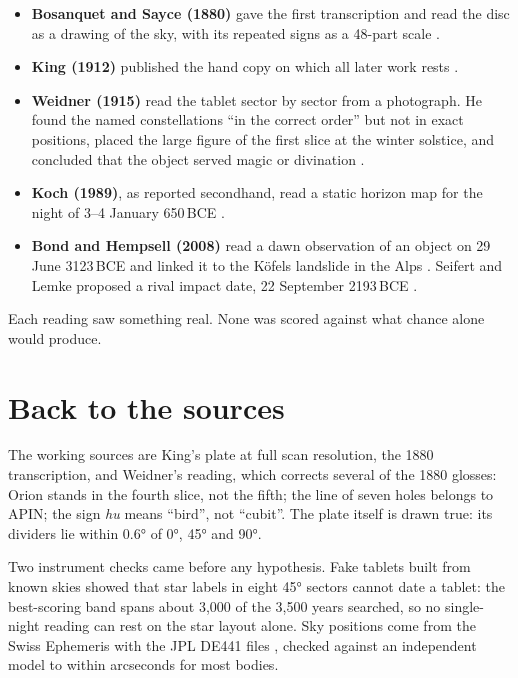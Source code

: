\documentclass[11pt]{article}
\begin{document}
\begin{itemize}
\item \textbf{Bosanquet and Sayce (1880)} gave the first transcription and read the disc as a drawing
of the sky, with its repeated signs as a 48-part scale \cite{bs1880}.
\item \textbf{King (1912)} published the hand copy on which all later work rests \cite{king1912}.
\item \textbf{Weidner (1915)} read the tablet sector by sector from a photograph. He found the named
constellations ``in the correct order'' but not in exact positions, placed the large figure of
the first slice at the winter solstice, and concluded that the object served magic or divination
\cite{weidner1915}.
\item \textbf{Koch (1989)}, as reported secondhand, read a static horizon map for the night of
3--4 January 650\,BCE \cite{koch1989}.
\item \textbf{Bond and Hempsell (2008)} read a dawn observation of an object on 29 June 3123\,BCE and
linked it to the Köfels landslide in the Alps \cite{bh2008,bristol2008}. Seifert and Lemke proposed a
rival impact date, 22 September 2193\,BCE \cite{sl2019}.
\end{itemize}

\noindent Each reading saw something real. None was scored against what chance alone would produce.

\section{Back to the sources}

The working sources are King's plate at full scan resolution, the 1880 transcription, and Weidner's
reading, which corrects several of the 1880 glosses: Orion stands in the fourth slice, not the fifth;
the line of seven holes belongs to APIN; the sign \emph{hu} means ``bird'', not ``cubit''. The plate
itself is drawn true: its dividers lie within 0.6° of 0°, 45° and 90°.

Two instrument checks came before any hypothesis. Fake tablets built from known skies showed that
star labels in eight 45° sectors cannot date a tablet: the best-scoring band spans about 3{,}000 of
the 3{,}500 years searched, so no single-night reading can rest on the star layout alone. Sky
positions come from the Swiss Ephemeris with the JPL DE441 files \cite{swisseph,de441}, checked against
an independent model to within arcseconds for most bodies.
\end{document}
